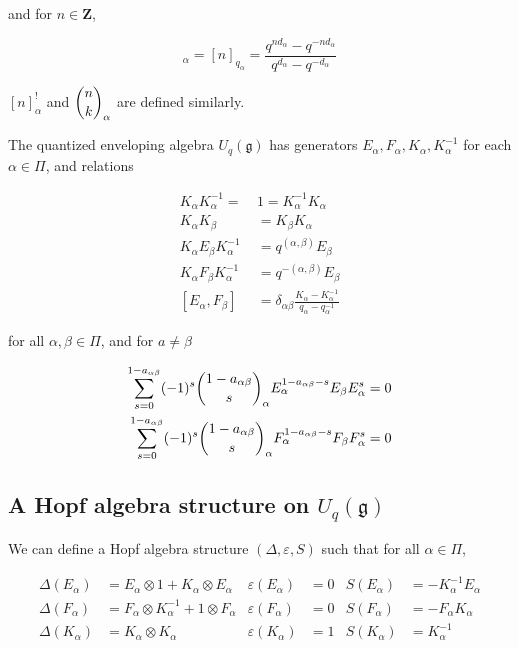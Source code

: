         and for $n \in \mathbf{Z}$,

        \begin{equation}
            [n]_\alpha = [n]_{q_\alpha} = \frac{q^{nd_\alpha} - q^{-nd_\alpha}}{q^{d_\alpha} - q^{-d_\alpha}}
        \end{equation}

        $[n]_\alpha^!$ and $\dbinom{n}{k}_\alpha$ are defined similarly.

        \begin{defn}
            The quantized enveloping algebra $U_q(\mathfrak{g})$ has generators
            $E_\alpha, F_\alpha, K_\alpha, K_\alpha^{-1}$ for each $\alpha \in
            \Pi$, and relations

            \begin{align}
                K_\alpha K_\alpha^{-1} =\ &1  = K_\alpha^{-1}K_\alpha \\
                K_\alpha K_\beta &= K_\beta K_\alpha \\
                K_\alpha E_\beta K_\alpha^{-1} &= q^{(\alpha, \beta)} E_\beta \\
                K_\alpha F_\beta K_\alpha^{-1} &= q^{-(\alpha, \beta)} E_\beta \\
                [E_\alpha, F_\beta] &= \delta_{\alpha\beta} \frac{K_\alpha - K_\alpha^{-1}}{ q_\alpha - q_\alpha^{-1}} 
            \end{align}

            for all $\alpha, \beta \in \Pi$, and for $a \neq \beta$

            \begin{align}
                \sum_{s=0}^{1-a_{\alpha\beta}} (-1)^s \dbinom{1-a_{\alpha\beta}}{s}_\alpha E_\alpha^{1-a_{\alpha\beta} - s} E_\beta E_\alpha^s  &= 0 \\
                \sum_{s=0}^{1-a_{\alpha\beta}} (-1)^s \dbinom{1-a_{\alpha\beta}}{s}_\alpha F_\alpha^{1-a_{\alpha\beta} - s} F_\beta F_\alpha^s  &= 0 
            \end{align}
        \end{defn}
        \subsection{A Hopf algebra structure on $U_q(\mathfrak{g})$}

        We can define a Hopf algebra structure $(\Delta, \varepsilon, S)$ such
        that for all $\alpha \in \Pi$,

        \begin{align}
            \Delta(E_\alpha) &= E_\alpha \otimes 1 + K_\alpha \otimes E_\alpha      & \varepsilon(E_\alpha) &= 0  & S(E_\alpha) &= -K_\alpha^{-1} E_\alpha \\
            \Delta(F_\alpha) &= F_\alpha \otimes K_\alpha^{-1} + 1 \otimes F_\alpha & \varepsilon(F_\alpha) &= 0  & S(F_\alpha) &= -F_\alpha K_\alpha \\
            \Delta(K_\alpha) &= K_\alpha \otimes K_\alpha                           & \varepsilon(K_\alpha) &= 1  & S(K_\alpha) &= K_\alpha^{-1}
        \end{align}
